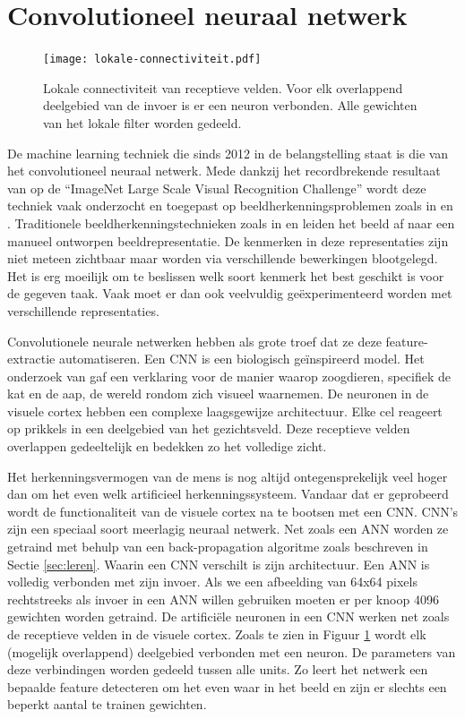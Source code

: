 \section{Convolutioneel neuraal netwerk}
\begin{figure}[!t]
	\centering
	\texttt{[image: lokale-connectiviteit.pdf]}
	\caption{Lokale connectiviteit van receptieve velden. Voor elk overlappend deelgebied van de invoer is er een neuron verbonden. Alle gewichten van het lokale filter worden gedeeld.}
	\label{fig:lokale-connectiviteit}
\end{figure}
De machine learning techniek die sinds 2012 in de belangstelling staat is die van het convolutioneel neuraal netwerk. Mede dankzij het recordbrekende resultaat van \cite{cnn-krizhevsky} op de ``ImageNet Large Scale Visual Recognition Challenge'' wordt deze techniek vaak onderzocht en toegepast op beeldherkenningsproblemen zoals in \cite{cnn-ji} en \cite{cnn-karpathy}.
\npar Traditionele beeldherkenningstechnieken zoals in \cite{perronnin2010improving} en \cite{jhuang2007biologically} leiden het beeld af naar een manueel ontworpen beeldrepresentatie. De kenmerken in deze representaties zijn niet meteen zichtbaar maar worden via verschillende bewerkingen blootgelegd. Het is erg moeilijk om te beslissen welk soort kenmerk het best geschikt is voor de gegeven taak. Vaak moet er dan ook veelvuldig ge\"experimenteerd worden met verschillende representaties.

\npar Convolutionele neurale netwerken hebben als grote troef dat ze deze feature-extractie automatiseren. Een CNN is een biologisch ge\"inspireerd model. Het onderzoek van \cite{hubel1968receptive} gaf een verklaring voor de manier waarop zoogdieren, specifiek de kat en de aap, de wereld rondom zich visueel waarnemen. De neuronen in de visuele cortex hebben een complexe laagsgewijze architectuur. Elke cel reageert op prikkels in een deelgebied van het gezichtsveld. Deze receptieve velden overlappen gedeeltelijk en bedekken zo het volledige zicht.

\npar Het herkenningsvermogen van de mens is nog altijd ontegensprekelijk veel hoger dan om het even welk artificieel herkenningssysteem. Vandaar dat er geprobeerd wordt de functionaliteit van de visuele cortex na te bootsen met een CNN. 
\npar CNN's zijn een speciaal soort meerlagig neuraal netwerk. Net zoals een ANN worden ze getraind met behulp van een back-propagation algoritme zoals beschreven in Sectie \ref{sec:leren}. Waarin een CNN verschilt is zijn architectuur. Een ANN is volledig verbonden met zijn invoer. Als we een afbeelding van 64x64 pixels rechtstreeks als invoer in een ANN willen gebruiken moeten er per knoop 4096 gewichten worden getraind. 
\npar De artifici\"ele neuronen in een CNN werken net zoals de receptieve velden in de visuele cortex. Zoals te zien in Figuur \ref{fig:lokale-connectiviteit} wordt elk (mogelijk overlappend) deelgebied verbonden met een neuron. De parameters van deze verbindingen worden gedeeld tussen alle units. Zo leert het netwerk een bepaalde feature detecteren om het even waar in het beeld en zijn er slechts een beperkt aantal te trainen gewichten.

